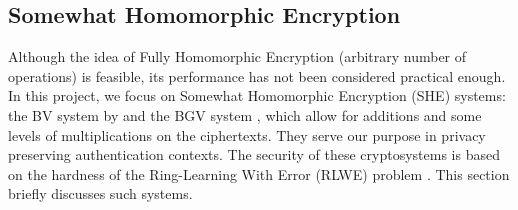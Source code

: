 \subsection{Somewhat Homomorphic Encryption}
Although the idea of Fully Homomorphic Encryption (arbitrary
number of operations) is feasible, its performance has not been considered
practical enough. In this project, we focus on Somewhat Homomorphic
Encryption (SHE) systems: the BV system by \cite{brakerski2011fully} and the BGV
system \cite{brakerski2014leveled}, which allow for additions and some levels of
multiplications on the ciphertexts. They serve our purpose in
privacy preserving authentication contexts. The security of these cryptosystems
is based on the hardness of the Ring-Learning With Error (RLWE) problem
\cite{lyubashevsky2010ideal}. This section briefly discusses such systems.
\begin{description}


\end{description}
